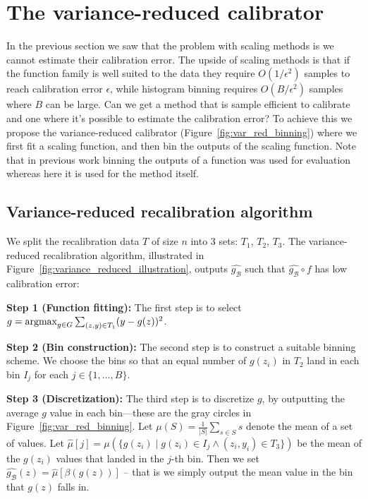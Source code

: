 \section{The variance-reduced calibrator}
\label{sec:calibrating_models}

In the previous section we saw that the problem with scaling methods is we cannot estimate their calibration error. The upside of scaling methods is that if the function family is well suited  to the data they require $O(1/\epsilon^2)$ samples to reach calibration error $\epsilon$, while histogram binning requires $O(B/\epsilon^2)$ samples where $B$ can be large. Can we get a method that is sample efficient to calibrate and one where it's possible to estimate the calibration error? To achieve this\pl{,} we propose the variance-reduced calibrator (Figure~\ref{fig:var_red_binning}) where we first fit a scaling function, and then bin the outputs of the scaling function. Note that in previous work binning the outputs of a function was used for evaluation whereas here it is used for the method itself.

\subsection{Variance-reduced recalibration algorithm}

We split the recalibration data $T$ of size $n$ into 3 sets: $T_1$, $T_2$, $T_3$. The variance-reduced recalibration algorithm, illustrated in Figure~\ref{fig:variance_reduced_illustration}, outputs $\hat{g_{\mathcal{B}}}$ such that $\hat{g_{\mathcal{B}}} \circ f$ has low calibration error:

\textbf{Step 1 (Function fitting):} The first step is to select $g = \mathop{\mbox{argmax}}_{g \in G} \sum_{(z, y) \in T_1} (y - g(z))^2$.

\textbf{Step 2 (Bin construction):} The second step is to construct a suitable binning scheme. We choose the bins so that an equal number of $g(z_i)$ in $T_2$ land in each bin $I_j$ for each $j \in \{1, \dots, B\}$.

\textbf{Step 3 (Discretization):} The third step is to discretize $g$, by outputting the average $g$ value in each bin---these are the gray circles in Figure~\ref{fig:var_red_binning}. Let $\mu(S) = \frac{1}{|S|} \sum_{s \in S} s$ denote the mean of a set of values.
Let $\hat{\mu}[j] = \mu(\{ g(z_i) \; | \; g(z_i) \in I_j \wedge (z_i, y_i) \in T_3 \})$ be the mean of the $g(z_i)$ values that landed in the $j$-th bin.
Then we set $\hat{g_{\mathcal{B}}}(z) = \hat{\mu}[\beta(g(z))]$ -- that is we simply output the mean value in the bin that $g(z)$ falls in.


